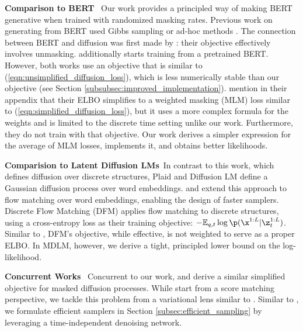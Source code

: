 \documentclass{article} %
\begin{document}
{\textbf{Comparison to BERT}~
Our work provides a principled way of making BERT generative when trained with randomized masking rates. Previous work on generating from BERT used Gibbs sampling or ad-hoc methods \citep{maskpredict,pmlm,wang2019bert}. The connection between BERT and diffusion was first made by \citet{austin2021structured}: their objective effectively involves unmasking. \citet{he2022diffusionbert} additionally starts training from a pretrained BERT. However, both works use an objective that is similar to (\ref{eqn:unsimplified_diffusion_loss}), which is less numerically stable than our objective (see Section \ref{subsubsec:improved_implementation}).
\citet{austin2021structured} mention in their appendix that their ELBO simplifies to a weighted masking (MLM) loss similar to (\ref{eqn:simplified_diffusion_loss}), but it uses a more complex formula for the weights and is limited to the discrete time setting unlike our work. Furthermore, they do not train with that objective. Our work derives a simpler expression for the average of MLM losses, implements it, and obtains better likelihoods.

\textbf{Comparision to Latent Diffusion LMs}~In contrast to this work, which defines diffusion over discrete structures, Plaid \citep{gulrajani2024plaid} and Diffusion LM \citep{li2022diffusion} define a Gaussian diffusion process over word embeddings. \citet{zhang2024language} and \citet{hu2024flow} extend this approach to flow matching over word embeddings, enabling the design of faster samplers. Discrete Flow Matching (DFM) \citep{campbell2024generative} applies flow matching to discrete structures, using a cross-entropy loss as their training objective: $- \mathbb{E}_{q,t} \log \p(\x^{1:L} | \z_t^{1:L})$.
Similar to \citet{chang2022maskgit}, DFM’s objective, while effective, is not weighted to serve as a proper ELBO. In MDLM, however, we derive a tight, principled lower bound on the log-likelihood.

\textbf{Concurrent Works}~
Concurrent to our work, \citet{shi2024simplified} and \citet{ou2024absorbingdiscretediffusionsecretly} derive a similar simplified objective for masked diffusion processes.
While \citet{ou2024absorbingdiscretediffusionsecretly} start from a score matching perspective, we tackle this problem from a variational lens similar to \citet{shi2024simplified}.
Similar to \citet{ou2024absorbingdiscretediffusionsecretly}, we formulate efficient samplers in Section \ref{subsec:efficient_sampling} by leveraging a time-independent denoising network.

}
\end{document}
